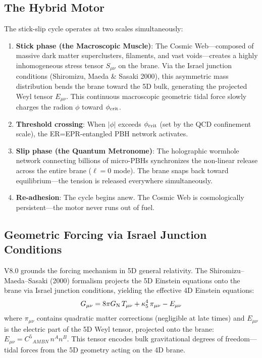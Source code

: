 \subsection{The Hybrid Motor}

The stick-slip cycle operates at two scales simultaneously:

\begin{enumerate}
  \item \textbf{Stick phase (the Macroscopic Muscle)}: The Cosmic Web---composed of massive dark matter superclusters, filaments, and vast voids---creates a highly inhomogeneous stress tensor $S_{\mu\nu}$ on the brane. Via the Israel junction conditions (Shiromizu, Maeda \& Sasaki 2000), this asymmetric mass distribution bends the brane toward the 5D bulk, generating the projected Weyl tensor $E_{\mu\nu}$. This continuous macroscopic geometric tidal force slowly charges the radion $\phi$ toward $\phi_\text{crit}$.

  \item \textbf{Threshold crossing}: When $|\phi|$ exceeds $\phi_\text{crit}$ (set by the QCD confinement scale), the ER=EPR-entangled PBH network activates.

  \item \textbf{Slip phase (the Quantum Metronome)}: The holographic wormhole network connecting billions of micro-PBHs synchronizes the non-linear release across the entire brane ($\ell=0$ mode). The brane snaps back toward equilibrium---the tension is released everywhere simultaneously.

  \item \textbf{Re-adhesion}: The cycle begins anew. The Cosmic Web is cosmologically persistent---the motor never runs out of fuel.
\end{enumerate}

\subsection{Geometric Forcing via Israel Junction Conditions}

V8.0 grounds the forcing mechanism in 5D general relativity. The Shiromizu--Maeda--Sasaki (2000) formalism projects the 5D Einstein equations onto the brane via Israel junction conditions, yielding the effective 4D Einstein equations:
\begin{equation}
G_{\mu\nu} = 8\pi G_\text{N}\, T_{\mu\nu} + \kappa_5^4\, \pi_{\mu\nu} - E_{\mu\nu}
\end{equation}
where $\pi_{\mu\nu}$ contains quadratic matter corrections (negligible at late times) and $E_{\mu\nu}$ is the electric part of the 5D Weyl tensor, projected onto the brane: $E_{\mu\nu} = C^5{}_{AMBN}\,n^A n^B$. This tensor encodes bulk gravitational degrees of freedom---tidal forces from the 5D geometry acting on the 4D brane.


